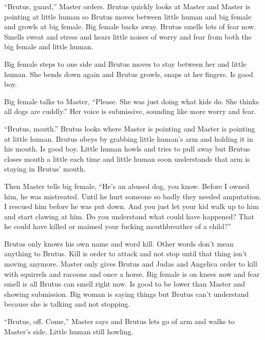 ``Brutus, guard,'' Master orders.  Brutus quickly looks at Master and Master is pointing at little human so Brutus moves between little human and big female and growls at big female.  Big female backs away.  Brutus smells lots of fear now.  Smells sweat and stress and hears little noises of worry and fear from both the big female and little human.



Big female steps to one side and Brutus moves to stay between her and little human.  She bends down again and Brutus growls, snaps at her fingers.  Is good boy.



Big female talks to Master, ``Please.  She was just doing what kids do.  She thinks all dogs are cuddly.''  Her voice is submissive, sounding like more worry and fear.



``Brutus, mouth.''  Brutus looks where Master is pointing and Master is pointing at little human.  Brutus obeys by grabbing little human's arm and holding it in his mouth.  Is good boy.  Little human howls and tries to pull away but Brutus closes mouth a little each time and little human soon understands that arm is staying in Brutus' mouth.



Then Master tells big female, ``He's an abused dog, you know.  Before I owned him, he was mistreated.  Until he hurt someone so badly they needed amputation.  I rescued him before he was put down.  And you just let your kid walk up to him and start clawing at him.  Do you understand what could have happened?  That he could have killed or maimed your fucking mouthbreather of a child?''



Brutus only knows his own name and word kill.  Other words don't mean anything to Brutus.  Kill is order to attack and not stop until that thing isn't moving anymore.  Master only gives Brutus and Judas and Angelica order to kill with squirrels and racoons and once a horse.  Big female is on knees now and fear smell is all Brutus can smell right now.  Is good to be lower than Master and showing submission.  Big woman is saying things but Brutus can't understand because she is talking and not stopping.



``Brutus, off.  Come,'' Master says and Brutus lets go of arm and walks to Master's side.  Little human still howling.



